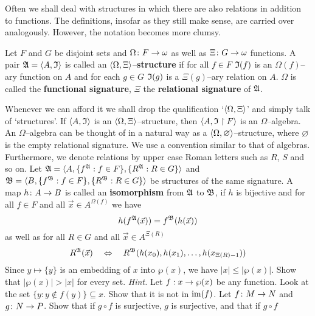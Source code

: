 Often we shall deal with structures in which there are
also relations in addition to functions. The definitions,
insofar as they still make sense, are carried over
analogously. However, the notation becomes more clumsy.
\begin{defn}
Let $F$ and $G$ be disjoint sets and $\Omega \colon F \rightarrow
\omega$ as well as $\Xi \colon G \rightarrow \omega$ functions. A
pair $\mathfrak{A} = \langle A, \mathfrak{I}\rangle$ is called an $\langle \Omega,
\Xi\rangle$--\textbf{structure} 
if for all $f \in F$ $\mathfrak{I}(f)$
is an $\Omega(f)$--ary function on $A$ and for each
$g \in G$ $\mathfrak{I}(g)$ is a $\Xi(g)$--ary relation
on $A$. $\Omega$ is called the 
\textbf{functional signature}, $\Xi$ the \textbf{relational signature}
of $\mathfrak{A}$.
\end{defn}
Whenever we can afford it we shall drop the qualification `$\langle
\Omega, \Xi\rangle$' and simply talk of `structures'. If $\langle A,
\mathfrak{I}\rangle$ is an $\langle \Omega, \Xi\rangle$--structure, then $\langle A, \mathfrak{I}
\restriction F\rangle$ is an $\Omega$--algebra. An $\Omega$--algebra
can be thought of in a natural way as a $\langle \Omega,
\varnothing\rangle$--structure, where $\varnothing$ is the empty
relational signature. We use a convention similar to that of
algebras. Furthermore, we denote relations by upper case Roman
letters such as $R$, $S$ and so on. Let $\mathfrak{A} = \langle A,
\{f^{\mathfrak{A}} : f \in F\}, \{R^{\mathfrak{A}} : R \in G\}\rangle$ and $\mathfrak{B} = \langle
B, \{f^{\mathfrak{B}} : f \in F\}, \{R^{\mathfrak{B}} : R \in G\}\rangle$ be structures
of the same signature. A map $h \colon A \rightarrow B$ is called an 
\textbf{isomorphism} from $\mathfrak{A}$ to $\mathfrak{B}$, if $h$ is bijective and for all
$f \in F$ and all $\vec{x} \in A^{\Omega(f)}$ we have
\begin{equation}
h(f^{\mathfrak{A}}(\vec{x})) = f^{\mathfrak{B}}(h(\vec{x})) 
\end{equation}
as well as for all $R \in G$ and all $\vec{x} \in A^{\Xi(R)}$
\begin{equation}
R^{\mathfrak{A}}(\vec{x}) \quad\Leftrightarrow\quad
R^{\mathfrak{B}}(h(x_0), h(x_1), \dotsc, h(x_{\Xi(R)-1})) 
\end{equation}
\vplatz
\exercise
Since $y \mapsto \{y\}$ is an embedding of $x$ into $\wp(x)$, we 
have $|x| \leq |\wp(x)|$. Show that $|\wp(x)| > |x|$ for every set. 
{\it Hint.} Let $f : x \rightarrow \wp(x)$ be any function. Look at the set 
$\{y : y \not\in f(y)\} \subseteq x$. Show that it is not in 
$\operatorname{im}(f)$.
\vplatz
\exercise
Let $f \colon M \rightarrow N$ and $g \colon N \rightarrow P$. Show that if 
$g \circ f$ is surjective, $g$ is surjective, and that if $g \circ f$ 
